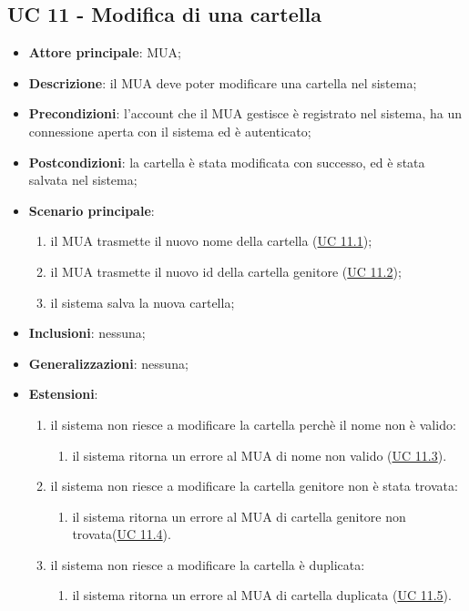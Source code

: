 \subsection{UC 11 - Modifica di una cartella} \label{sec:UC11}
\begin{itemize}
    \item \textbf{Attore principale}: MUA;
    \item \textbf{Descrizione}: il MUA deve poter modificare una cartella nel sistema;
    \item \textbf{Precondizioni}: l’account che il MUA gestisce è registrato nel sistema, ha un connessione aperta con il sistema ed è autenticato;
    \item \textbf{Postcondizioni}: la cartella è stata modificata con successo, ed è stata salvata nel sistema;
    \item \textbf{Scenario principale}:
        \begin{enumerate}
            \item il MUA trasmette il nuovo nome della cartella (\hyperref[sec:UC11.1]{UC 11.1});
            \item il MUA trasmette il nuovo id della cartella genitore (\hyperref[sec:UC11.2]{UC 11.2});
            \item il sistema salva la nuova cartella;
        \end{enumerate}
    \item \textbf{Inclusioni}: nessuna;
    \item \textbf{Generalizzazioni}: nessuna;
    \item \textbf{Estensioni}: 
    \begin{enumerate}[label=\alph*.]
        \item il sistema non riesce a modificare la cartella perchè il nome non è valido:
        \begin{enumerate}[label=\arabic*.]
            \item il sistema ritorna un errore al MUA di nome non valido (\hyperref[sec:UC11.3]{UC 11.3}).
        \end{enumerate}
        \item il sistema non riesce a modificare la cartella genitore non è stata trovata:
        \begin{enumerate}[label=\arabic*.]
            \item il sistema ritorna un errore al MUA di cartella genitore non trovata(\hyperref[sec:UC11.4]{UC 11.4}).
        \end{enumerate}
        \item il sistema non riesce a modificare la cartella è duplicata:
        \begin{enumerate}[label=\arabic*.]
            \item il sistema ritorna un errore al MUA di cartella duplicata (\hyperref[sec:UC11.5]{UC 11.5}).
        \end{enumerate}
    \end{enumerate}
\end{itemize}

